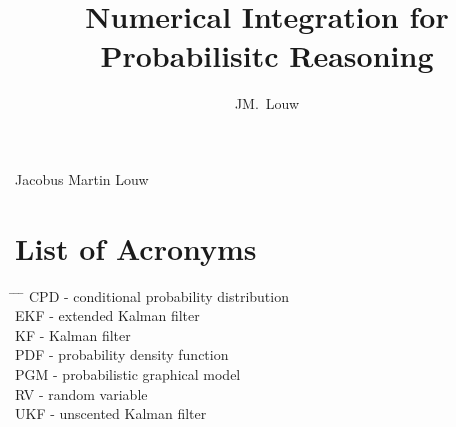 \documentclass[12pt,oneside,openany,a4paper, %
afrikaans,english,
]{memoir}
\numberwithin{equation}{chapter}
\newcommand*{\WaterMark}[2][0.15\paperwidth]{%
\AddToShipoutPicture*{\AtTextCenter{%
\parbox[c]{0pt}{\makebox[0pt][c]{%
\texttt{[image: \#2]}}}}}}
\begin{document}
\pagestyle{plain}
\frontmatter
\title{Numerical Integration for Probabilisitc Reasoning}
\author{JM.\ Louw}{Jacobus Martin Louw}
\frontmatter
\TitlePage

\DeclarationPage

\address{Department of Electrical and Electronic Engineering,\\
University of Stellenbosch,\\
Private Bag X1, 7602 Matieland, South Africa.}
\newpage

\tableofcontents
{}
\pagebreak
\listoffigures

\chapter{List of Acronyms}

\begin{tabbing}
\hspace*{1em}\= \hspace*{5em} \= \hspace*{3em} \= \kill %
\> CPD	\> - \> conditional probability distribution\\
\> EKF	\> - \> extended Kalman filter\\
\> KF	\> - \> Kalman filter\\
\> PDF	\> - \> probability density function\\
\> PGM	\> - \> probabilistic graphical model\\
\> RV \> - \>	random variable\\
\> UKF	\> - \> unscented Kalman filter\\
\end{tabbing}
\end{document}
